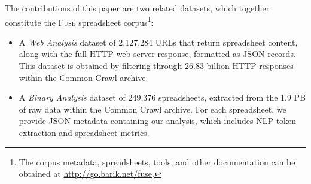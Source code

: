 \documentclass[conference]{IEEEtran}
\newcommand{\urlcount}{2,127,284}
\newcommand{\xlscount}{249,376}
\begin{document}





The contributions of this paper are two related datasets, which together constitute the \textsc{Fuse} spreadsheet corpus\footnote{The corpus metadata, spreadsheets, tools, and other documentation can be obtained at \url{http://go.barik.net/fuse}.}:

\begin{itemize}
\item A \emph{Web Analysis} dataset of \urlcount{} URLs that return spreadsheet content, along with the full HTTP web server response, formatted as JSON records. This dataset is obtained by filtering through 26.83 billion HTTP responses within the Common Crawl archive.
\item A \emph{Binary Analysis} dataset of \xlscount{} spreadsheets, extracted from the 1.9 PB of raw data within the Common Crawl archive. For each spreadsheet, we provide JSON metadata containing our analysis, which includes NLP token extraction and spreadsheet metrics.
\end{itemize}
\end{document}
